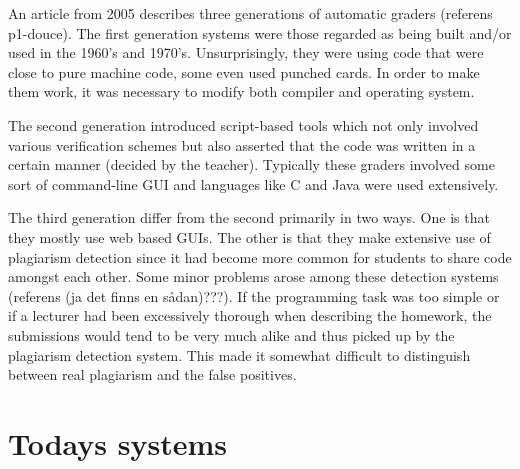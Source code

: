 An article from 2005 describes three generations of automatic graders (referens p1-douce). The first generation systems were those regarded as being built and/or used in the 1960's and 1970's. Unsurprisingly, they were using code that were close to pure machine code, some even used punched cards. In order to make them work, it was necessary to modify both compiler and operating system. 

The second generation introduced script-based tools which not only involved various verification schemes but also asserted that the code was written in a certain manner (decided by the teacher). Typically these graders involved some sort of command-line GUI and languages like C and Java were used extensively.

The third generation differ from the second primarily in two ways. One is that they mostly use web based GUIs. The other is that they make extensive use of plagiarism detection since it had become more common for students to share code amongst each other. Some minor problems arose among these detection systems (referens (ja det finns en sådan)???). If the programming task was too simple or if a lecturer had been excessively thorough when describing the homework, the submissions would tend to be very much alike and thus picked up by the plagiarism detection system. This made it somewhat difficult to distinguish between real plagiarism and the false positives. 




\section{Todays systems}
